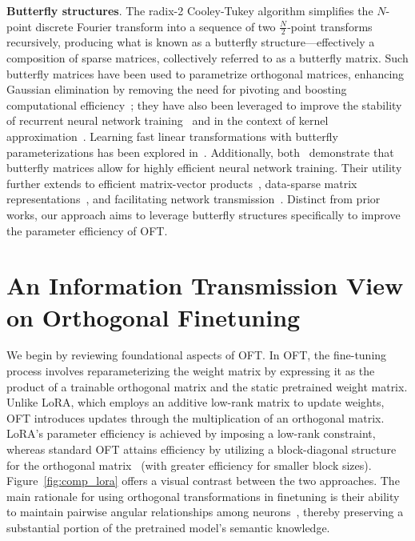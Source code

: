 \textbf{Butterfly structures}. The radix-2 Cooley-Tukey algorithm simplifies the $N$-point discrete Fourier transform into a sequence of two $\frac{N}{2}$-point transforms recursively, producing what is known as a butterfly structure—effectively a composition of sparse matrices, collectively referred to as a butterfly matrix. Such butterfly matrices have been used to parametrize orthogonal matrices, enhancing Gaussian elimination by removing the need for pivoting and boosting computational efficiency~\cite{parker1995random}; they have also been leveraged to improve the stability of recurrent neural network training~\cite{jing2017tunable} and in the context of kernel approximation~\cite{munkhoeva2018quadrature}. Learning fast linear transformations with butterfly parameterizations has been explored in~\cite{dao2019learning,dao2019kaleidoscope}. Additionally, both~\cite{chen2022pixelated,dao2022monarch} demonstrate that butterfly matrices allow for highly efficient neural network training. Their utility further extends to efficient matrix-vector products~\cite{michielssen1996multilevel,o2010algorithm}, data-sparse matrix representations~\cite{li2015butterfly}, and facilitating network transmission~\cite{klasing1994broadcasting,li2003linear,rajasingh2016transmission}. Distinct from prior works, our approach aims to leverage butterfly structures specifically to improve the parameter efficiency of OFT.

\section{An Information Transmission View on Orthogonal Finetuning}

We begin by reviewing foundational aspects of OFT. In OFT, the fine-tuning process involves reparameterizing the weight matrix by expressing it as the product of a trainable orthogonal matrix and the static pretrained weight matrix. Unlike LoRA, which employs an additive low-rank matrix to update weights, OFT introduces updates through the multiplication of an orthogonal matrix. LoRA’s parameter efficiency is achieved by imposing a low-rank constraint, whereas standard OFT attains efficiency by utilizing a block-diagonal structure for the orthogonal matrix~\cite{qiu2023controlling} (with greater efficiency for smaller block sizes). Figure~\ref{fig:comp_lora} offers a visual contrast between the two approaches. The main rationale for using orthogonal transformations in finetuning is their ability to maintain pairwise angular relationships among neurons~\cite{liu2018learning,liu2021orthogonal,qiu2023controlling}, thereby preserving a substantial portion of the pretrained model’s semantic knowledge. 

